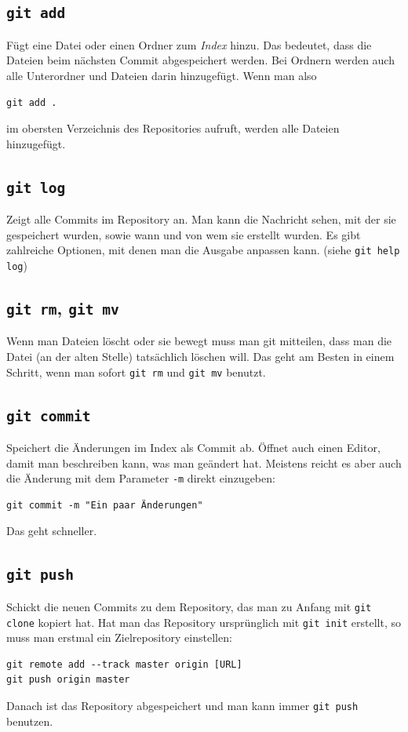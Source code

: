 \subsection{\texttt{git add}}
Fügt eine Datei oder einen Ordner zum \textit{Index} hinzu. Das bedeutet, dass die Dateien beim nächsten Commit abgespeichert werden.
Bei Ordnern werden auch alle Unterordner und Dateien darin hinzugefügt.
Wenn man also
\begin{verbatim}
git add .
\end{verbatim}
im obersten Verzeichnis des Repositories aufruft, werden alle Dateien hinzugefügt.

\subsection{\texttt{git log}}
Zeigt alle Commits im Repository an.
Man kann die Nachricht sehen, mit der sie gespeichert wurden, sowie wann und von wem sie erstellt wurden.
Es gibt zahlreiche Optionen, mit denen man die Ausgabe anpassen kann.
(siehe \verb|git help log|)

\subsection{\texttt{git rm}, \texttt{git mv}}
Wenn man Dateien löscht oder sie bewegt muss man git mitteilen, dass man die Datei (an der alten Stelle) tatsächlich löschen will.
Das geht am Besten in einem Schritt, wenn man sofort \texttt{git rm} und \texttt{git mv} benutzt.

\subsection{\texttt{git commit}}
Speichert die Änderungen im Index als Commit ab.
Öffnet auch einen Editor, damit man beschreiben kann, was man geändert hat.
Meistens reicht es aber auch die Änderung mit dem Parameter \verb|-m| direkt einzugeben:
\begin{verbatim}
git commit -m "Ein paar Änderungen"
\end{verbatim}
Das geht schneller.

\subsection{\texttt{git push}}
Schickt die neuen Commits zu dem Repository, das man zu Anfang mit \verb|git clone| kopiert hat.
Hat man das Repository ursprünglich mit \verb|git init| erstellt, so muss man erstmal ein Zielrepository einstellen:
\begin{verbatim}
git remote add --track master origin [URL]
git push origin master
\end{verbatim}
Danach ist das Repository abgespeichert und man kann immer \verb|git push| benutzen.

